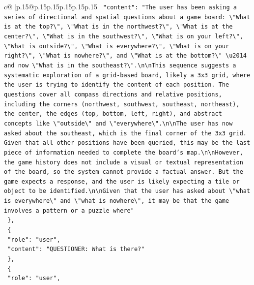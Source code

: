 \documentclass{article}
\begin{document}
{\begin{supertabular}{c@{$\;$}|p{.15\linewidth}@{}p{.15\linewidth}p{.15\linewidth}p{.15\linewidth}p{.15\linewidth}p{.15\linewidth}}
{{{\texttt{    "content": "The user has been asking a series of directional and spatial questions about a game board: \textbackslash{}"What is at the top?\textbackslash{}", \textbackslash{}"What is in the northwest?\textbackslash{}", \textbackslash{}"What is at the center?\textbackslash{}", \textbackslash{}"What is in the southwest?\textbackslash{}", \textbackslash{}"What is on your left?\textbackslash{}", \textbackslash{}"What is outside?\textbackslash{}", \textbackslash{}"What is everywhere?\textbackslash{}", \textbackslash{}"What is on your right?\textbackslash{}", \textbackslash{}"What is nowhere?\textbackslash{}", and \textbackslash{}"What is at the bottom?\textbackslash{}" \textbackslash{}u2014 and now \textbackslash{}"What is in the southeast?\textbackslash{}".\textbackslash{}n\textbackslash{}nThis sequence suggests a systematic exploration of a grid{-}based board, likely a 3x3 grid, where the user is trying to identify the content of each position. The questions cover all compass directions and relative positions, including the corners (northwest, southwest, southeast, northeast), the center, the edges (top, bottom, left, right), and abstract concepts like \textbackslash{}"outside\textbackslash{}" and \textbackslash{}"everywhere\textbackslash{}".\textbackslash{}n\textbackslash{}nThe user has now asked about the southeast, which is the final corner of the 3x3 grid. Given that all other positions have been queried, this may be the last piece of information needed to complete the board's map.\textbackslash{}n\textbackslash{}nHowever, the game history does not include a visual or textual representation of the board, so the system cannot provide a factual answer. But the game expects a response, and the user is likely expecting a tile or object to be identified.\textbackslash{}n\textbackslash{}nGiven that the user has asked about \textbackslash{}"what is everywhere\textbackslash{}" and \textbackslash{}"what is nowhere\textbackslash{}", it may be that the game involves a pattern or a puzzle where"} \\
\texttt{  \},} \\
\texttt{  \{} \\
\texttt{    "role": "user",} \\
\texttt{    "content": "QUESTIONER: What is there?"} \\
\texttt{  \},} \\
\texttt{  \{} \\
\texttt{    "role": "user",} \\
}}}
\end{supertabular}}
\end{document}

